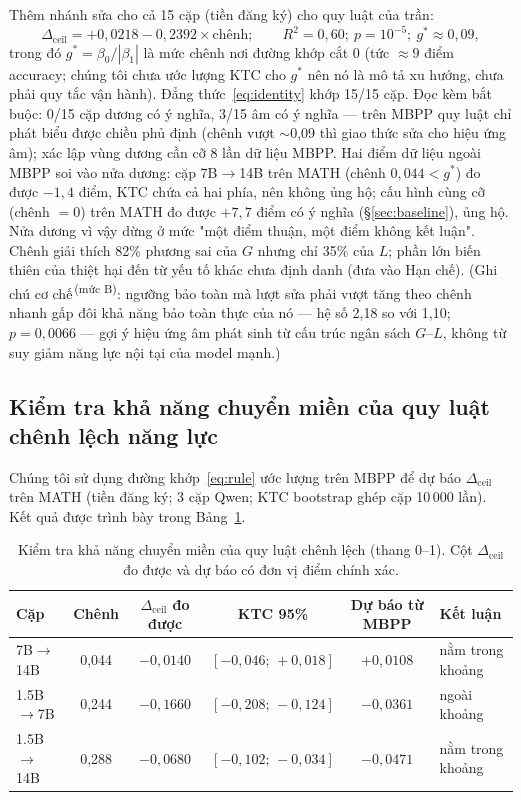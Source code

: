 \documentclass[11pt,a4paper]{article}
\newcommand{\mucB}{\textsuperscript{\,(mức B)}}
\newcommand{\dceil}{\Delta_{\mathrm{ceil}}}
\begin{document}
Thêm nhánh sửa cho cả 15 cặp (tiền đăng ký) cho quy luật của trần:
\begin{equation}\label{eq:rule}
\dceil = +0{,}0218 - 0{,}2392 \times \text{chênh};\qquad R^2 = 0{,}60;\ p = 10^{-5};\
g^\ast \approx 0{,}09,
\end{equation}
trong đó $g^\ast = \beta_0/|\beta_1|$ là mức chênh nơi đường khớp cắt 0 (tức $\approx 9$ điểm accuracy; chúng tôi chưa ước lượng KTC cho $g^\ast$ nên nó là mô tả xu hướng, chưa phải quy tắc vận hành). Đẳng thức~\eqref{eq:identity} khớp 15/15 cặp. Đọc kèm bắt buộc: 0/15 cặp dương có ý nghĩa, 3/15 âm có ý nghĩa --- trên MBPP quy luật chỉ phát biểu được chiều phủ định (chênh vượt $\sim$0,09 thì giao thức sửa cho hiệu ứng âm); xác lập vùng dương cần cỡ 8 lần dữ liệu MBPP. Hai điểm dữ liệu ngoài MBPP soi vào nửa dương: cặp 7B$\to$14B trên MATH (chênh $0{,}044 < g^\ast$) đo được $-1{,}4$ điểm, KTC chứa cả hai phía, nên không ủng hộ; cấu hình cùng cỡ (chênh $=0$) trên MATH đo được $+7{,}7$ điểm có ý nghĩa (\S\ref{sec:baseline}), ủng hộ. Nửa dương vì vậy dừng ở mức "một điểm thuận, một điểm không kết luận". Chênh giải thích 82\% phương sai của $G$ nhưng chỉ 35\% của $L$; phần lớn biến thiên của thiệt hại đến từ yếu tố khác chưa định danh (đưa vào Hạn chế). (Ghi chú cơ chế\mucB: ngưỡng bảo toàn mà lượt sửa phải vượt tăng theo chênh nhanh gấp đôi khả năng bảo toàn thực của nó --- hệ số 2,18 so với 1,10; $p=0{,}0066$ --- gợi ý hiệu ứng âm phát sinh từ cấu trúc ngân sách $G$--$L$, không từ suy giảm năng lực nội tại của model mạnh.)

\subsection{Kiểm tra khả năng chuyển miền của quy luật chênh lệch năng lực}\label{sec:transfer}

Chúng tôi sử dụng đường khớp~\eqref{eq:rule} ước lượng trên MBPP để dự báo $\dceil$ trên MATH (tiền đăng ký; 3 cặp Qwen; KTC bootstrap ghép cặp 10\,000 lần). Kết quả được trình bày trong Bảng~\ref{tab:transfer}.

\begin{table}[htbp]
\centering
\small
\begin{tabular}{@{}l c c c c l@{}}
\toprule
Cặp & Chênh & $\dceil$ đo được & KTC 95\% & Dự báo từ MBPP & Kết luận\\
\midrule
7B$\to$14B & 0,044 & $-0{,}0140$ & $[-0{,}046;\,+0{,}018]$ & $+0{,}0108$ & nằm trong khoảng\\
1.5B$\to$7B & 0,244 & $-0{,}1660$ & $[-0{,}208;\,-0{,}124]$ & $-0{,}0361$ & ngoài khoảng\\
1.5B$\to$14B & 0,288 & $-0{,}0680$ & $[-0{,}102;\,-0{,}034]$ & $-0{,}0471$ & nằm trong khoảng\\
\bottomrule
\end{tabular}
\caption{Kiểm tra khả năng chuyển miền của quy luật chênh lệch (thang 0--1). Cột $\dceil$ đo được và dự báo có đơn vị điểm chính xác.}
\label{tab:transfer}
\end{table}
\end{document}
